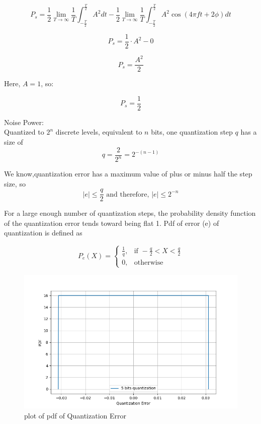 \documentclass[journal,12pt,onecolumn]{IEEEtran}
\begin{document}
\begin{equation}
P_s = \frac{1}{2} \lim_{{T \to \infty}} \frac{1}{T} \int_{{-\frac{T}{2}}}^{{\frac{T}{2}}} A^2 dt - \frac{1}{2} \lim_{{T \to \infty}} \frac{1}{T} \int_{{-\frac{T}{2}}}^{{\frac{T}{2}}} A^2 \cos(4\pi f t + 2\phi) dt
\end{equation}

\begin{equation}
P_s = \frac{1}{2} \cdot A^2 - 0
\end{equation}

\begin{equation}
P_s = \frac{A^2}{2}
\end{equation}

Here, \(A = 1\), so:

\begin{equation}
P_s = \frac{1}{2}
\end{equation}
\item Noise Power:\\
Quantized to $2^n$ discrete levels, equivalent to $n$ bits, one quantization step $q$ has a size of
\begin{equation}
q = \frac{2}{2^{n}} = 2^{-(n-1)}
\end{equation}

We know,quantization error has a maximum value of plus or minus half the
step size, so 
\begin{equation}
\left| e \right| \leq \frac{q}{2} \text{ and therefore, } \left| e \right| \leq 2^{-n}
\end{equation}

For a large enough number of quantization steps, the probability density function of the quantization error tends toward being flat 1.
Pdf of error (e) of quantization is defined as 

\begin{equation}
P_e(X) = 
\begin{cases}
    \frac{1}{q}, & \text{if } -\frac{q}{2} < X < \frac{q}{2} \\
    0, & \text{otherwise}
\end{cases}
\end{equation}
\begin{figure}[H]
  \centering
  \includegraphics[width=1\textwidth]{Graph/b.png}
  \caption{plot of pdf of Quantization Error}
  \label{fig:Gate.31.2023.2}
\end{figure}
\end{document}
